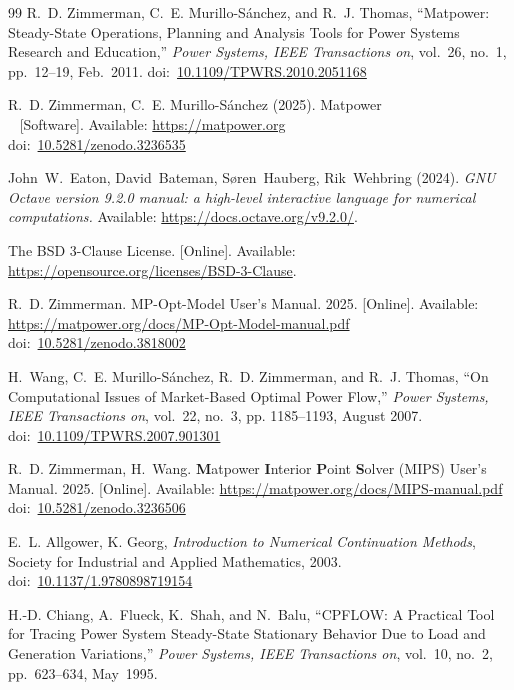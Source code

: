 \documentclass[12pt]{article}
\newcommand{\matpower}[0]{{\sc Matpower}}
\newcommand{\mips}[0]{{MIPS}}
\newcommand{\mipsname}[0]{{{\bf M}{\sc atpower} \textbf{I}nterior \textbf{P}oint \textbf{S}olver}}
\newcommand{\mpom}[0]{\mbox{MP-Opt-Model}}
\newcommand{\mpomname}[0]{\mpom{}}
\newcommand{\doi}[1]{doi:~\href{https://doi.org/#1}{#1}}
\numberwithin{equation}{section}
\numberwithin{table}{section}
\numberwithin{figure}{section}
\begin{document}
\clearpage
\begin{thebibliography}{99}
R.~D. Zimmerman, C.~E. Murillo-S{\'a}nchez, and R.~J. Thomas, ``\matpower{}: Steady-State Operations, Planning and Analysis Tools for Power Systems Research and Education,'' \emph{Power Systems, IEEE Transactions on}, vol.~26, no.~1, pp.~12--19, Feb.~2011.
\doi{10.1109/TPWRS.2010.2051168}

R.~D. Zimmerman, C.~E. Murillo-S{\'a}nchez (2025). \matpower{}\\~
[Software]. Available: \url{https://matpower.org}\\
\doi{10.5281/zenodo.3236535}

John~W.~Eaton, David~Bateman, S{\o}ren~Hauberg, Rik~Wehbring (2024). \emph{GNU Octave version 9.2.0 manual: a high-level interactive language for numerical computations.} Available: \url{https://docs.octave.org/v9.2.0/}.

The BSD 3-Clause License. [Online]. Available: \url{https://opensource.org/licenses/BSD-3-Clause}.

R.~D. Zimmerman. \mpomname{} User's Manual. 2025.
[Online]. Available: \url{https://matpower.org/docs/MP-Opt-Model-manual.pdf}\\
\doi{10.5281/zenodo.3818002}

H.~Wang, C.~E. Murillo-S{\'a}nchez, R.~D. Zimmerman, and R.~J. Thomas, ``On
Computational Issues of Market-Based Optimal Power Flow,'' \emph{Power
Systems, IEEE Transactions on}, vol.~22, no.~3, pp. 1185--1193, August 2007.
\doi{10.1109/TPWRS.2007.901301}

R.~D. Zimmerman, H.~Wang. \mipsname{} (\mips{}) User's Manual. 2025.
[Online]. Available: \url{https://matpower.org/docs/MIPS-manual.pdf}\\
\doi{10.5281/zenodo.3236506}

E.~L. Allgower, K. Georg, \emph{Introduction to Numerical Continuation Methods}, Society for Industrial and Applied Mathematics, 2003.
\doi{10.1137/1.9780898719154}

H.-D. Chiang, A.~Flueck, K.~Shah, and N.~Balu, ``CPFLOW:  A Practical Tool for Tracing Power System Steady-State Stationary Behavior Due to Load and Generation Variations,'' \emph{Power Systems, IEEE Transactions on}, vol.~10, no.~2, pp.~623--634, May~1995.


\end{thebibliography}
\end{document}
